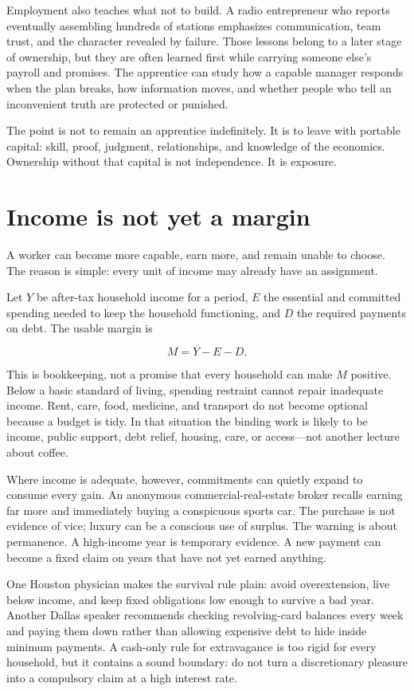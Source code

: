Employment also teaches what not to build. A radio entrepreneur who reports
eventually assembling hundreds of stations emphasizes communication, team
trust, and the character revealed by failure. Those lessons belong to a later
stage of ownership, but they are often learned first while carrying someone
else's payroll and promises. The apprentice can study how a capable manager
responds when the plan breaks, how information moves, and whether people who
tell an inconvenient truth are protected or punished.

The point is not to remain an apprentice indefinitely. It is to leave with
portable capital: skill, proof, judgment, relationships, and knowledge of the
economics. Ownership without that capital is not independence. It is exposure.

\section{Income is not yet a margin}

A worker can become more capable, earn more, and remain unable to choose. The
reason is simple: every unit of income may already have an assignment.

Let $Y$ be after-tax household income for a period, $E$ the essential and
committed spending needed to keep the household functioning, and $D$ the
required payments on debt. The usable margin is

\begin{equation}
M = Y - E - D.
\end{equation}

This is bookkeeping, not a promise that every household can make $M$ positive.
Below a basic standard of living, spending restraint cannot repair inadequate
income. Rent, care, food, medicine, and transport do not become optional
because a budget is tidy. In that situation the binding work is likely to be
income, public support, debt relief, housing, care, or access---not another
lecture about coffee.

Where income is adequate, however, commitments can quietly expand to consume
every gain. An anonymous commercial-real-estate broker recalls earning far more
and immediately buying a conspicuous sports car. The purchase is not evidence
of vice; luxury can be a conscious use of surplus. The warning is about
permanence. A high-income year is temporary evidence. A new payment can become
a fixed claim on years that have not yet earned anything.

One Houston physician makes the survival rule plain: avoid overextension, live
below income, and keep fixed obligations low enough to survive a bad year.
Another Dallas speaker recommends checking revolving-card balances every week
and paying them down rather than allowing expensive debt to hide inside minimum
payments. A cash-only rule for extravagance is too rigid for every household,
but it contains a sound boundary: do not turn a discretionary pleasure into a
compulsory claim at a high interest rate.

